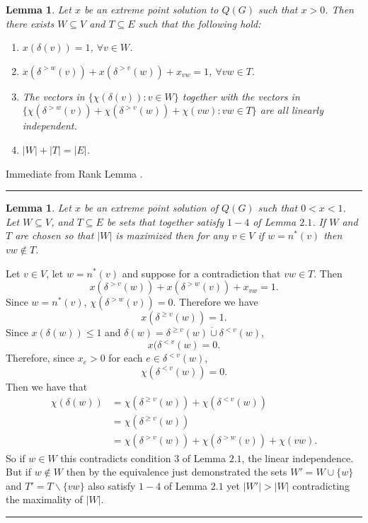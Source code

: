 \documentclass[letterpaper,12pt,oneside,onecolumn]{article}
\newtheorem{lemma}[fact]{Lemma}
\newenvironment{proof}{{\bf Proof:  }}{\hfill\rule{2mm}{2mm}}
\begin{document}
\begin{lemma}
Let $x$ be an extreme point solution to $Q(G)$ such that $x>0$. Then there exists $W \subseteq V$ and $T \subseteq E$ such that the following hold:
\begin{enumerate}
\item $x(\delta(v)) = 1$, $\forall v \in W$.
\item $x(\delta^{>w}(v)) + x(\delta^{>v}(w)) + x_{vw} = 1$, $\forall vw \in T$.
\item The vectors in $\{\chi(\delta(v)) : v \in W\}$ together with the vectors in $\{\chi(\delta^{>w}(v)) + \chi(\delta^{>v}(w)) + \chi(vw) : vw \in T\}$ are all linearly independent.
\item $|W| + |T| = |E|$.
\end{enumerate}
\end{lemma}
\begin{proof}
Immediate from Rank Lemma \cite{lau2011iterative}. 
\end{proof}
\begin{lemma}
Let $x$ be an extreme point solution of $Q(G)$ such that $0 < x < 1$. Let $W \subseteq V$, and $T \subseteq E$ be sets that together satisfy $1-4$ of Lemma $2.1$. If $W$ and $T$ are chosen so that $|W|$ is maximized then for any $v \in V$ if $w = n^*(v)$ then $vw \not\in T$.
\end{lemma}
\begin{proof}
Let $v \in V$, let $w = n^*(v)$ and suppose for a contradiction that $vw \in T$. Then 
$$x(\delta^{>v}(w)) + x(\delta^{>w}(v)) + x_{vw} = 1. $$
Since $w = n^*(v)$, $\chi(\delta^{>w}(v)) = 0$. Therefore we have
$$x(\delta^{\geq v}(w)) = 1.$$
Since $x(\delta(w)) \leq 1$ and $\delta(w) = \delta^{\geq v}(w) \dot\cup \delta^{< v}(w)$, $$x(\delta^{<v}(w) = 0. $$
Therefore, since $x_e > 0$ for each $e \in \delta^{< v}(w)$, $$\chi(\delta^{< v}(w)) = 0.$$
Then we have that
\begin{align*}
\chi(\delta(w)) &= \chi(\delta^{\geq v}(w)) + \chi(\delta^{<v}(w)) \\
&= \chi(\delta^{\geq v}(w)) \\
&= \chi(\delta^{> v}(w)) + \chi(\delta^{> w}(v)) + \chi(vw).
\end{align*}
So if $w \in W$ this contradicts condition $3$ of Lemma $2.1$, the linear independence. But if $w \not\in W$ then by the equivalence just demonstrated the sets $W' = W \cup \{w\}$ and $T' = T \backslash \{vw\}$ also satisfy $1-4$ of Lemma $2.1$ yet $|W'| > |W|$ contradicting the maximality of $|W|$. 
\end{proof}
\end{document}
